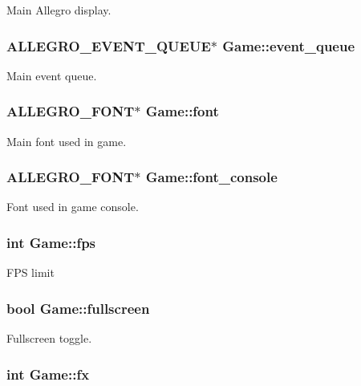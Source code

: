 \-Main \-Allegro display. \hypertarget{structGame_a820782e408ff7a704dc12af67eb0c44f}{
\subsubsection[{event\-\_\-queue}]{\setlength{\rightskip}{0pt plus 5cm}\-A\-L\-L\-E\-G\-R\-O\-\_\-\-E\-V\-E\-N\-T\-\_\-\-Q\-U\-E\-U\-E$\ast$ {\bf \-Game\-::event\-\_\-queue}}}\label{structGame_a820782e408ff7a704dc12af67eb0c44f}
\-Main event queue. \hypertarget{structGame_a455bfdaacd5f2bda80b640c02ec3250e}{
\subsubsection[{font}]{\setlength{\rightskip}{0pt plus 5cm}\-A\-L\-L\-E\-G\-R\-O\-\_\-\-F\-O\-N\-T$\ast$ {\bf \-Game\-::font}}}\label{structGame_a455bfdaacd5f2bda80b640c02ec3250e}
\-Main font used in game. \hypertarget{structGame_a692f2c3ec0f3e956aa8bdac00a864bf8}{
\subsubsection[{font\-\_\-console}]{\setlength{\rightskip}{0pt plus 5cm}\-A\-L\-L\-E\-G\-R\-O\-\_\-\-F\-O\-N\-T$\ast$ {\bf \-Game\-::font\-\_\-console}}}\label{structGame_a692f2c3ec0f3e956aa8bdac00a864bf8}
\-Font used in game console. \hypertarget{structGame_a28534ff51b7b2adc76bdd8894a750d0d}{
\subsubsection[{fps}]{\setlength{\rightskip}{0pt plus 5cm}int {\bf \-Game\-::fps}}}\label{structGame_a28534ff51b7b2adc76bdd8894a750d0d}
\-F\-P\-S limit \hypertarget{structGame_a026034417d95688ab99ba2e96e064b7f}{
\subsubsection[{fullscreen}]{\setlength{\rightskip}{0pt plus 5cm}bool {\bf \-Game\-::fullscreen}}}\label{structGame_a026034417d95688ab99ba2e96e064b7f}
\-Fullscreen toggle. \hypertarget{structGame_a10c0e81918f42e7367b4590e6885048e}{
\subsubsection[{fx}]{\setlength{\rightskip}{0pt plus 5cm}int {\bf \-Game\-::fx}}}\label{structGame_a10c0e81918f42e7367b4590e6885048e}
